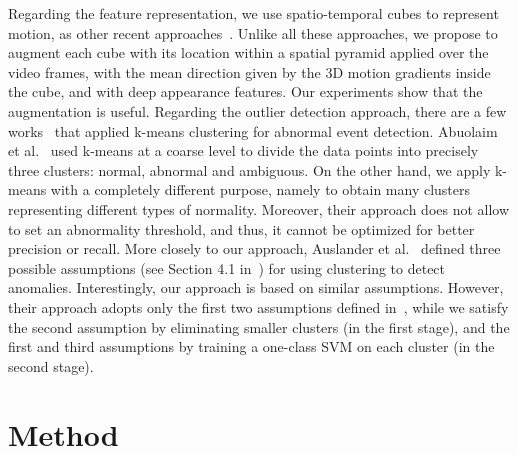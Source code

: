 \documentclass[10pt,twocolumn,letterpaper]{article}
\begin{document}
Regarding the feature representation, we use spatio-temporal cubes to represent motion, as other recent approaches~\cite{Giorno-ECCV-2016,Ionescu-ICCV-2017,Lu-ICCV-2013}. Unlike all these approaches, we propose to augment each cube with its location within a spatial pyramid applied over the video frames, with the mean direction given by the 3D motion gradients inside the cube, and with deep appearance features. Our experiments show that the augmentation is useful.
Regarding the outlier detection approach, there are a few works~\cite{Abuolaim-CAIP-2017,Auslander-SPIE-2011} that applied k-means clustering for abnormal event detection. Abuolaim et al.~\cite{Abuolaim-CAIP-2017} used k-means at a coarse level to divide the data points into precisely three clusters: normal, abnormal and ambiguous. On the other hand, we apply k-means with a completely different purpose, namely to obtain many clusters representing different types of normality. Moreover, their approach does not allow to set an abnormality threshold, and thus, it cannot be optimized for better precision or recall. More closely to our approach, Auslander et al.~\cite{Auslander-SPIE-2011} defined three possible assumptions (see Section 4.1 in~\cite{Auslander-SPIE-2011}) for using clustering to detect anomalies. Interestingly, our approach is based on similar assumptions. However, their approach adopts only the first two assumptions defined in~\cite{Auslander-SPIE-2011}, while we satisfy the second assumption by eliminating smaller clusters (in the first stage), and the first and third assumptions by training a one-class SVM on each cluster (in the second stage).

\vspace*{-0.2cm}
\section{Method}
\label{sec_Method}
\vspace*{-0.1cm}
\end{document}
